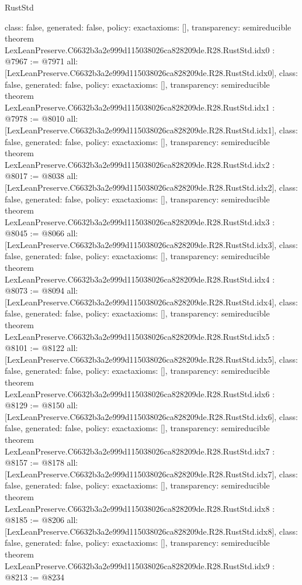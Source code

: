 \begin{lexlean}{RustStd}
\begin{coremodule}
{  class: false,
  generated: false,
  policy: exact{axioms: []},
  transparency: semireducible
}
theorem LexLeanPreserve.C6632b3a2e999d115038026ca828209de.R28.RustStd.idx0 : @7967 := @7971 {
  all: [LexLeanPreserve.C6632b3a2e999d115038026ca828209de.R28.RustStd.idx0],
  class: false,
  generated: false,
  policy: exact{axioms: []},
  transparency: semireducible
}
theorem LexLeanPreserve.C6632b3a2e999d115038026ca828209de.R28.RustStd.idx1 : @7978 := @8010 {
  all: [LexLeanPreserve.C6632b3a2e999d115038026ca828209de.R28.RustStd.idx1],
  class: false,
  generated: false,
  policy: exact{axioms: []},
  transparency: semireducible
}
theorem LexLeanPreserve.C6632b3a2e999d115038026ca828209de.R28.RustStd.idx2 : @8017 := @8038 {
  all: [LexLeanPreserve.C6632b3a2e999d115038026ca828209de.R28.RustStd.idx2],
  class: false,
  generated: false,
  policy: exact{axioms: []},
  transparency: semireducible
}
theorem LexLeanPreserve.C6632b3a2e999d115038026ca828209de.R28.RustStd.idx3 : @8045 := @8066 {
  all: [LexLeanPreserve.C6632b3a2e999d115038026ca828209de.R28.RustStd.idx3],
  class: false,
  generated: false,
  policy: exact{axioms: []},
  transparency: semireducible
}
theorem LexLeanPreserve.C6632b3a2e999d115038026ca828209de.R28.RustStd.idx4 : @8073 := @8094 {
  all: [LexLeanPreserve.C6632b3a2e999d115038026ca828209de.R28.RustStd.idx4],
  class: false,
  generated: false,
  policy: exact{axioms: []},
  transparency: semireducible
}
theorem LexLeanPreserve.C6632b3a2e999d115038026ca828209de.R28.RustStd.idx5 : @8101 := @8122 {
  all: [LexLeanPreserve.C6632b3a2e999d115038026ca828209de.R28.RustStd.idx5],
  class: false,
  generated: false,
  policy: exact{axioms: []},
  transparency: semireducible
}
theorem LexLeanPreserve.C6632b3a2e999d115038026ca828209de.R28.RustStd.idx6 : @8129 := @8150 {
  all: [LexLeanPreserve.C6632b3a2e999d115038026ca828209de.R28.RustStd.idx6],
  class: false,
  generated: false,
  policy: exact{axioms: []},
  transparency: semireducible
}
theorem LexLeanPreserve.C6632b3a2e999d115038026ca828209de.R28.RustStd.idx7 : @8157 := @8178 {
  all: [LexLeanPreserve.C6632b3a2e999d115038026ca828209de.R28.RustStd.idx7],
  class: false,
  generated: false,
  policy: exact{axioms: []},
  transparency: semireducible
}
theorem LexLeanPreserve.C6632b3a2e999d115038026ca828209de.R28.RustStd.idx8 : @8185 := @8206 {
  all: [LexLeanPreserve.C6632b3a2e999d115038026ca828209de.R28.RustStd.idx8],
  class: false,
  generated: false,
  policy: exact{axioms: []},
  transparency: semireducible
}
theorem LexLeanPreserve.C6632b3a2e999d115038026ca828209de.R28.RustStd.idx9 : @8213 := @8234 {
}
\end{coremodule}
\end{lexlean}
